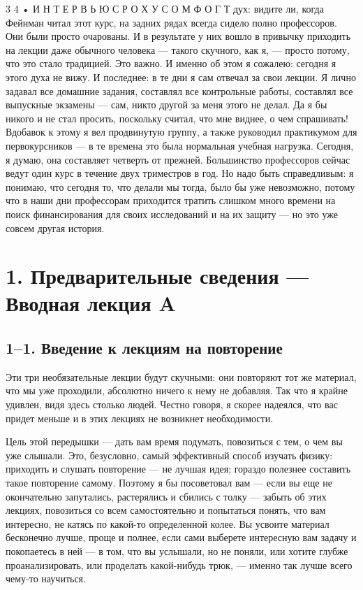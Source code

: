 \documentclass[11pt,oneside]{article}
\begin{document}
3 4 • И Н Т Е Р В Ь Ю  С  Р О Х У С О М  Ф О Г Т дух: видите ли, когда Фейнман читал этот курс, на задних рядах всегда сидело полно профессоров. Они были просто очарованы. И в результате у них вошло в привычку приходить на лекции даже обычного человека --- такого скучного, как я, --- просто потому, что это стало традицией. Это важно. И именно об этом я сожалею: сегодня я этого духа не вижу. И последнее: в те дни я сам отвечал за свои лекции. Я лично задавал все домашние задания, составлял все контрольные работы, составлял все выпускные экзамены --- сам, никто другой за меня этого не делал. Да я бы никого и не стал просить, поскольку считал, что мне виднее, о чем спрашивать! Вдобавок к этому я вел продвинутую группу, а также руководил практикумом для первокурсников --- в те времена это была нормальная учебная нагрузка. Сегодня, я думаю, она составляет четверть от прежней. Большинство профессоров сейчас ведут один курс в течение двух триместров в год. Но надо быть справедливым: я понимаю, что сегодня то, что делали мы тогда, было бы уже невозможно, потому что в наши дни профессорам приходится тратить слишком много времени на поиск финансирования для своих исследований и на их защиту --- но это уже совсем другая история.\par



\clearpage

\section*{1. Предварительные сведения --- Вводная лекция A}


\subsection*{1--1. Введение к лекциям на повторение}

Эти три необязательные лекции будут скучными: они повторяют тот же материал, что мы уже проходили, абсолютно ничего к нему не добавляя. Так что я крайне удивлен, видя здесь столько людей. Честно говоря, я скорее надеялся, что вас придет меньше и в этих лекциях не возникнет необходимости.\par

Цель этой передышки --- дать вам время подумать, повозиться с тем, о чем вы уже слышали. Это, безусловно, самый эффективный способ изучать физику: приходить и слушать повторение --- не лучшая идея; гораздо полезнее составить такое повторение самому. Поэтому я бы посоветовал вам --- если вы еще не окончательно запутались, растерялись и сбились с толку --- забыть об этих лекциях, повозиться со всем самостоятельно и попытаться понять, что вам интересно, не катясь по какой-то определенной колее. Вы усвоите материал бесконечно лучше, проще и полнее, если сами выберете интересную вам задачу и покопаетесь в ней --- в том, что вы услышали, но не поняли, или хотите глубже проанализировать, или проделать какой-нибудь трюк, --- именно так лучше всего чему-то научиться.\par
\end{document}
